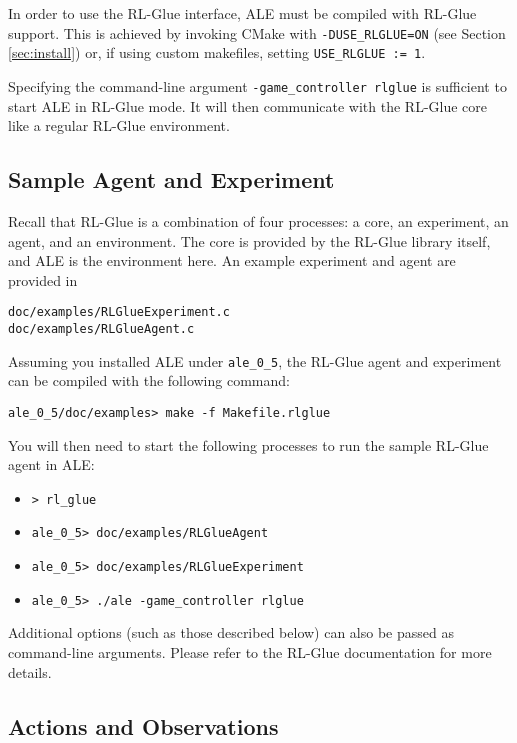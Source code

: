 \documentclass[12pt]{article}
\begin{document}
In order to use the RL-Glue interface, ALE must be compiled with RL-Glue support. This is achieved
by invoking CMake with \verb+-DUSE_RLGLUE=ON+ (see Section \ref{sec:install}) or, if using
custom makefiles, setting \verb+USE_RLGLUE := 1+. 

Specifying the command-line argument \verb+-game_controller rlglue+ is sufficient to start ALE in 
RL-Glue mode. It will then communicate with the RL-Glue core like a regular RL-Glue environment.

\subsection{Sample Agent and Experiment}

Recall that RL-Glue is a combination of four processes: a core, an experiment, an agent, and
an environment. The core is provided by the RL-Glue library itself, and ALE is the environment
here. An example experiment and agent are provided in 

\begin{verbatim}
doc/examples/RLGlueExperiment.c
doc/examples/RLGlueAgent.c
\end{verbatim}

Assuming you installed ALE under \verb+ale_0_5+, the RL-Glue agent and experiment
can be compiled with the following command: 

\begin{verbatim}
ale_0_5/doc/examples> make -f Makefile.rlglue 
\end{verbatim}

You will then need to start the following processes to run the sample RL-Glue agent in ALE:

\begin{itemize}
  \item{\verb+> rl_glue+} 
  \item{\verb+ale_0_5> doc/examples/RLGlueAgent+}
  \item{\verb+ale_0_5> doc/examples/RLGlueExperiment+}
  \item{\verb+ale_0_5> ./ale -game_controller rlglue+}
\end{itemize}

Additional options (such as those described below) can also be passed as command-line arguments.
Please refer to the RL-Glue documentation for more details. 


\subsection{Actions and Observations}
\end{document}
